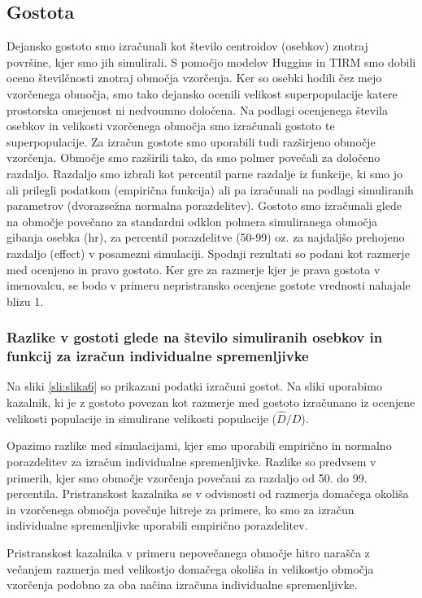 \subsection{Gostota}
Dejansko gostoto smo izračunali kot število centroidov (osebkov) znotraj površine, kjer smo jih simulirali. S pomočjo modelov Huggins in TIRM smo dobili oceno številčnosti znotraj območja vzorčenja. Ker so osebki hodili čez mejo vzorčenega območja, smo tako dejansko ocenili velikost superpopulacije katere prostorska omejenost ni nedvoumno določena. Na podlagi ocenjenega števila osebkov in velikosti vzorčenega območja smo izračunali gostoto te superpopulacije. Za izračun gostote smo uporabili tudi razširjeno območje vzorčenja. Območje smo razširili tako, da smo polmer povečali za določeno razdaljo. Razdaljo smo izbrali kot percentil parne razdalje iz funkcije, ki smo jo ali prilegli podatkom (empirična funkcija) ali pa izračunali na podlagi simuliranih parametrov (dvorazsežna normalna porazdelitev). Gostoto smo izračunali glede na območje povečano za standardni odklon polmera simuliranega območja gibanja osebka (hr), za percentil porazdelitve (50-99) oz. za najdaljšo prehojeno razdaljo (effect) v posamezni simulaciji. Spodnji rezultati so podani kot razmerje med ocenjeno in pravo gostoto. Ker gre za razmerje kjer je prava gostota v imenovalcu, se bodo v primeru nepristransko ocenjene gostote vrednosti nahajale blizu 1.

\subsubsection{Razlike v gostoti glede na število simuliranih osebkov in funkcij za izračun individualne spremenljivke}
Na sliki \ref{sli:slika6} so prikazani podatki izračuni gostot. Na sliki uporabimo kazalnik, ki je z gostoto povezan kot razmerje med gostoto izračunano iz ocenjene velikosti populacije in simulirane velikosti populacije ($\hat{D}/D$).

Opazimo razlike med simulacijami, kjer smo uporabili empirično in normalno porazdelitev za izračun individualne spremenljivke. Razlike so predvsem v primerih, kjer smo območje vzorčenja povečani za razdaljo od 50. do 99. percentila. Pristranskost kazalnika se v odvisnosti od razmerja domačega okoliša in vzorčenega območja povečuje hitreje za primere, ko smo za izračun individualne spremenljivke uporabili empirično porazdelitev.

Pristranskost kazalnika v primeru nepovečanega območje hitro narašča z večanjem razmerja med velikostjo domačega okoliša in velikostjo območja vzorčenja podobno za oba načina izračuna individualne spremenljivke.

